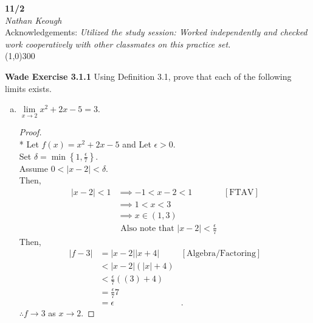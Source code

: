 \documentclass[a4paper]{article}
\newcommand{\bb}{\textbf}
\newcommand{\eps}{\epsilon}
\newcommand{\del}{\delta}
\begin{document}
    \begin{center}
        \Large \textbf{11/2} \\
        \large \textit{Nathan Keough} \\
        Acknowledgements: \emph{Utilized the study session: Worked independently and checked work cooperatively with other classmates on this practice set.} \vspace{.5pc} \\ \line(1,0){300} 
        \vspace{1pc}
    \end{center} 
    
    \begin{flushleft}


        \bb{Wade Exercise 3.1.1}
        Using Definition 3.1, prove that each of the following limits exists. \\
        \begin{enumerate}[a.]
            \item $\lim\limits_{x \to 2} x^2 + 2x -5 = 3$.
            
            \begin{proof}\mbox{}\\*
                Let $f(x) = x^2 + 2x -5$ and Let $\eps > 0$. \\ 
                Set $\del = \min\left\{1, \frac{\eps}{7}\right\}$. \\
                Assume $0 < \left| x - 2 \right| < \del $. \\
                Then, 
                \begin{align*}
                    |x-2| < 1 &\implies -1 < x-2 < 1 & [\text{FTAV}]\\
                    &\implies 1 < x < 3 &\\
                    &\implies x \in (1,3) &\\
                    &\text{  Also note that } |x-2|<\frac{\eps}{7}
                \end{align*}
                Then, 
                \begin{align*}
                    |f - 3| &= |x-2||x+4| & [\text{Algebra/Factoring}]\\
                               &< |x-2|(|x|+4) &\\
                               &< \frac{\eps}{7} ((3)+4) &\\
                               &= \frac{\eps}{7} 7 &\\
                               &= \eps &.
                \end{align*}
                $\therefore f \to 3$ as $x \to 2$.
            \end{proof}


\end{enumerate}
\end{flushleft}
\end{document}
